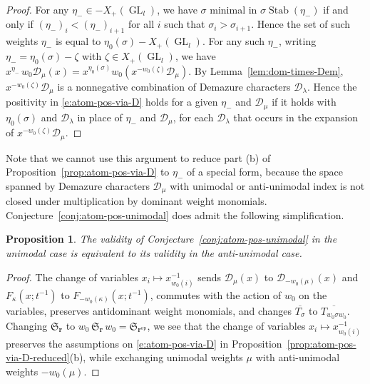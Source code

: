 \documentclass[12pt]{amsart}
\newtheorem{prop}[thm]{Proposition}
\theoremstyle{definition}
\theoremstyle{remark}
\newcommand{\rr}{{\mathbf r}}
\newcommand{\Sfrak}{{\mathfrak S}}
\newcommand{\Dcal}{{\mathcal D}}
\DeclareMathOperator{\GL}{GL}
\DeclareMathOperator{\op}{op}
\DeclareMathOperator{\Stab}{Stab}
\begin{document}
\begin{proof}
For any $\eta _{-}\in -X_{+}(\GL _{l})$, we have $\sigma $ minimal in
$\sigma \Stab (\eta _{-})$ if and only if $(\eta _{-})_{i}<(\eta
_{-})_{i+1}$ for all $i$ such that $\sigma _{i}>\sigma _{i+1}$.  Hence
the set of such weights $\eta _{-}$ is equal to $\eta _{0}(\sigma ) -
X_{+}(\GL _{l})$.  For any such $\eta _{-}$, writing $\eta _{-} = \eta
_{0}(\sigma ) - \zeta $ with $\zeta \in X_{+}(\GL _{l})$, we have
$x^{\eta _{-}}\, w_{0}\Dcal _{\mu }(x) = x^{\eta _{0}(\sigma )}
w_{0}(x^{-w_{0}(\zeta )} \Dcal _{\mu })$.  By
Lemma~\ref{lem:dom-times-Dem}, $x^{-w_{0}(\zeta )} \Dcal _{\mu }$ is a
nonnegative combination of Demazure characters $\Dcal _{\lambda }$.
Hence the positivity in \eqref{e:atom-pos-via-D} holds for a given
$\eta _{-}$ and $\Dcal _{\mu }$ if it holds with $\eta _{0}(\sigma )$
and $\Dcal _{\lambda }$ in place of $\eta _{-}$ and $\Dcal _{\mu }$,
for each $\Dcal _{\lambda }$ that occurs in the expansion of
$x^{-w_{0}(\zeta )} \Dcal _{\mu }$.
\end{proof}

Note that we cannot use this argument to reduce part (b) of
Proposition~\ref{prop:atom-pos-via-D} to $\eta _{-}$ of a special
form, because the space spanned by Demazure characters $\Dcal _{\mu }$
with unimodal or anti-unimodal index is not closed under
multiplication by dominant weight monomials.
Conjecture~\ref{conj:atom-pos-unimodal} does admit the following
simplification.

\begin{prop}\label{prop:unimodal-vs-antiunimodal}
The validity of Conjecture~\ref{conj:atom-pos-unimodal} in the
unimodal case is equivalent to its validity in the anti-unimodal case.
\end{prop}

\begin{proof}
The change of variables $x_{i}\mapsto x_{w_{0}(i)}^{-1}$ sends $\Dcal
_{\mu }(x)$ to $\Dcal _{-w_{0}(\mu )}(x)$ and $F_{\kappa }(x;t^{-1})$
to $F_{-w_{0}(\kappa )}(x;t^{-1})$, commutes with the action of
$w_{0}$ on the variables, preserves antidominant weight monomials, and
changes $\overline{T_{\sigma }}$ to $\overline{T_{w_{0}\sigma
w_{0}}}$.  Changing $\Sfrak _{\rr }$ to $w_{0}\, \Sfrak _{\rr}\, w_{0}
= \Sfrak _{\rr ^{\op }}$, we see that the change of variables
$x_{i}\mapsto x_{w_{0}(i)}^{-1}$ preserves the assumptions on
\eqref{e:atom-pos-via-D} in
Proposition~\ref{prop:atom-pos-via-D-reduced}(b), while exchanging
unimodal weights $\mu $ with anti-unimodal weights $-w_{0}(\mu )$.
\end{proof}
\end{document}
